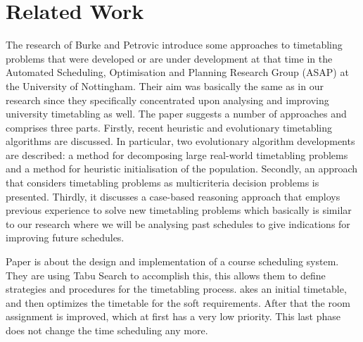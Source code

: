 \section{Related Work}
The research of Burke and Petrovic \cite{recentResearchDirectionsInAutomatedTimetabling} introduce some approaches to timetabling problems that were developed or are under development at that time in the Automated Scheduling, Optimisation and Planning Research Group
(ASAP) at the University of Nottingham. Their aim was basically the same as in our research since they specifically concentrated upon analysing and improving university timetabling as well. The paper suggests a number of approaches and comprises three parts. Firstly, recent
heuristic and evolutionary timetabling algorithms are discussed. In particular, two evolutionary algorithm developments
are described: a method for decomposing large real-world timetabling problems and a method for heuristic
initialisation of the population. Secondly, an approach that considers timetabling problems as multicriteria decision
problems is presented. Thirdly, it discusses a case-based reasoning approach that employs previous experience to solve
new timetabling problems which basically is similar to our research where we will be analysing past schedules to give indications for improving future schedules.

Paper \cite{designAndImplementationOfACourseSchedulingSystem} is about the design and implementation of a course scheduling system. They are using Tabu Search to accomplish this, this allows them to define strategies and procedures for the timetabling process. 
akes an initial timetable, and then optimizes the timetable for the soft requirements. After that the room assignment is improved, which at first has a very low priority. This last phase does not change the time scheduling any more.

